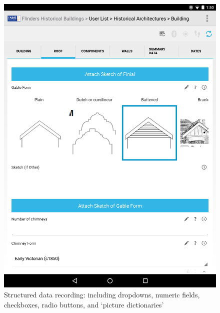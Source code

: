 \documentclass[preprint,12pt, a4paper]{elsarticle}
\begin{document}
\begin{figure}[!htb]
	\includegraphics[width=\linewidth]{image_0.png}
	\caption{Structured data recording: including dropdowns, numeric fields, checkboxes, radio buttons, and `picture dictionaries'}
	\label{fig:img0}
\endminipage\hfill
{}

\end{figure}
\end{document}
